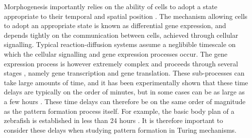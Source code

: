Morphogenesis importantly relies on the ability of cells to adopt a state appropriate to their temporal and spatial position \cite{gaffmonk}. The mechanism allowing cells to adopt an appropriate state is known as differential gene expression, and depends tightly on the communication between cells, achieved through cellular signalling. Typical reaction-diffusion systems assume a neglibible timescale on which the cellular signalling and gene expression processes occur. The gene expression process is however extremely complex and proceeds through several stages \cite{gaffmonk}, namely gene transcription and gene translation. These sub-processes can take large amounts of time, and it has been experimentally shown that these time delays are typically on the order of minutes, but in some cases can be as large as a few hours \cite{gaffmonk,tennyson}. These time delays can therefore be on the same order of magnitude as the pattern formation process itself. For example, the basic body plan of a zebrafish is established in less than 24 hours \cite{gaffmonk,kimmel}. It is therefore important to consider these delays when studying pattern formation in Turing mechanisms.
\\\\
